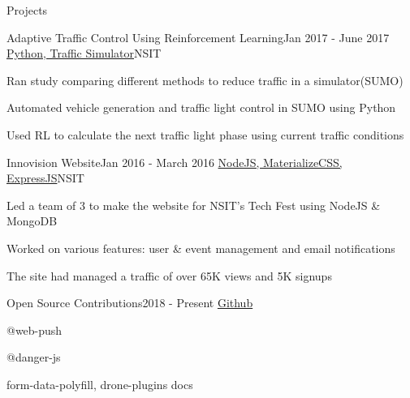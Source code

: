 \documentclass{resume} %
\begin{document}
\begin{rSection}{Projects}

    \begin{rSubsection}{Adaptive Traffic Control Using Reinforcement Learning}{Jan 2017 - June 2017}
    {\href{https://github.com/rohit-smpx/trafficRL}{Python, Traffic Simulator}}{NSIT}

        \item Ran study comparing different methods to reduce traffic in a simulator(SUMO)
        \item Automated vehicle generation and traffic light control in SUMO using Python
        \item Used RL to calculate the next traffic light phase using current traffic conditions
    \end{rSubsection}

    \begin{rSubsection}{Innovision Website}{Jan 2016 - March 2016}
    {\href{https://github.com/rohit-smpx/inno}{NodeJS, MaterializeCSS, ExpressJS}}{NSIT}

        \item Led a team of 3 to make the website for NSIT’s Tech Fest using NodeJS \& MongoDB
        \item Worked on various features: user \& event management and email notifications
        \item The site had managed a traffic of over 65K views and 5K signups
    \end{rSubsection}

    \begin{rSubsection}{Open Source Contributions}{2018 - Present}
    {\href{https://github.com/rohit-smpx}{Github}}{}

        \item @web-push
        \item @danger-js
        \item form-data-polyfill, drone-plugins docs
    \end{rSubsection}
    

\end{rSection}


\end{document}

